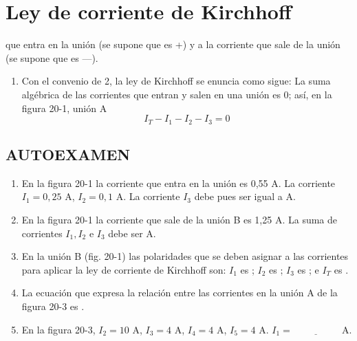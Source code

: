 \documentclass[12pt, a4paper]{article}
\begin{document}
\section*{Ley de corriente de Kirchhoff}

\noindent que entra en la unión (se supone que es +) y a la corriente que sale de la unión (se supone que es —).

\begin{enumerate}[label=\arabic*., start=3]
    \item Con el convenio de 2, la ley de Kirchhoff se enuncia como sigue: La suma algébrica de las corrientes que entran y salen en una unión es 0; así, en la figura 20-1, unión A
    \[
        I_T - I_1 - I_2 - I_3 = 0
    \]
\end{enumerate}

\subsection*{AUTOEXAMEN}
\begin{enumerate}[label=\arabic*.]
    \item En la figura 20-1 la corriente que entra en la unión es 0,55 A. La corriente $I_1 = 0,25$ A, $I_2 = 0,1$ A. La corriente $I_3$ debe pues ser igual a \underline{\hspace{2cm}} A.
    \item En la figura 20-1 la corriente que sale de la unión B es 1,25 A. La suma de corrientes $I_1, I_2$ e $I_3$ debe ser \underline{\hspace{2cm}} A.
    \item En la unión B (fig. 20-1) las polaridades que se deben asignar a las corrientes para aplicar la ley de corriente de Kirchhoff son: $I_1$ es \underline{\hspace{1cm}}; $I_2$ es \underline{\hspace{1cm}}; $I_3$ es \underline{\hspace{1cm}}; e $I_T$ es \underline{\hspace{1cm}}.
    \item La ecuación que expresa la relación entre las corrientes en la unión A de la figura 20-3 es \underline{\hspace{4cm}}.
    \item En la figura 20-3, $I_2 = 10$ A, $I_3 = 4$ A, $I_4 = 4$ A, $I_5 = 4$ A. $I_1 = \underline{\hspace{2cm}}$ A.
\end{enumerate}
\end{document}
